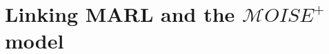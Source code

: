 \documentclass[sn-mathphys-num]{sn-jnl}%
\theoremstyle{thmstyleone}%
\theoremstyle{thmstyletwo}%
\theoremstyle{thmstylethree}%
\begin{document}






\section{Linking MARL and the $\mathcal{M}OISE^+$ model}\label{sec:linking_marl_moise}
\label{sec:marl_moise_linking}
\end{document}
